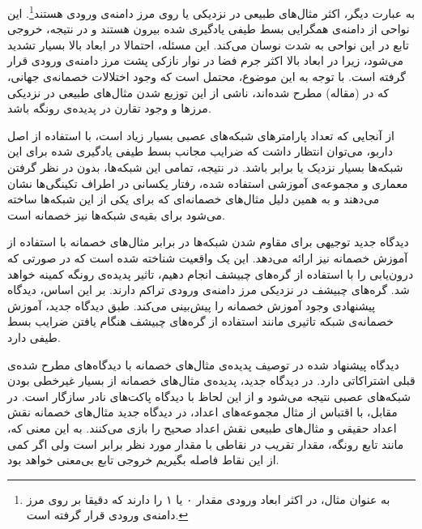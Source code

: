 \documentclass[12pt,onecolumn,a4paper]{article}
\begin{document}
به عبارت دیگر، اکثر مثال‌های طبیعی در نزدیکی یا روی مرز دامنه‌ی ورودی هستند\footnote{به عنوان مثال، در 
اکثر ابعاد ورودی مقدار ۰ یا ۱ را دارند که دقیقا بر روی مرز دامنه‌ی ورودی قرار گرفته است.}.
این نواحی از دامنه‌ی همگرایی بسط طیفی یادگیری شده بیرون هستند و در نتیجه، خروجی تابع در این نواحی به شدت نوسان می‌کند. این مسئله، احتمالا در ابعاد بالا بسیار تشدید می‌شود، زیرا در ابعاد بالا اکثر جرم فضا در نوار نازکی پشت مرز دامنه‌ی ورودی قرار گرفته است. با توجه به این موضوع، محتمل است که وجود اختلالات خصمانه‌ی جهانی، که در (مقاله) مطرح شده‌اند، ناشی از این توزیع شدن مثال‌های طبیعی در نزدیکی مرزها و وجود تقارن در پدیده‌ی رونگه باشد.

از آنجایی که تعداد پارامترهای شبکه‌های عصبی بسیار زیاد است، با استفاده از اصل داربو، می‌توان انتظار داشت که ضرایب مجانب بسط طیفی یادگیری شده برای این شبکه‌ها بسیار نزدیک یا برابر باشد. در نتیجه، تمامی این شبکه‌ها، بدون در نظر گرفتن معماری و مجموعه‌ی آموزشی استفاده شده، رفتار یکسانی در اطراف تکینگی‌ها نشان می‌دهند و به همین دلیل مثال‌های خصمانه‌ای که برای یکی از این شبکه‌ها ساخته می‌شود برای بقیه‌ی شبکه‌ها نیز خصمانه است.

دیدگاه جدید توجیهی برای مقاوم شدن شبکه‌ها در برابر مثال‌های خصمانه با استفاده از آموزش خصمانه نیز ارائه می‌دهد. این یک واقعیت شناخته شده است که در صورتی که درون‌یابی را با استفاده از گره‌های چبیشف انجام دهیم، تاثیر پدیده‌ی رونگه کمینه خواهد شد. گره‌های چبیشف در نزدیکی مرز دامنه‌ی ورودی تراکم دارند. بر این اساس، دیدگاه پیشنهادی وجود آموزش خصمانه را پیش‌بینی می‌کند. طبق دیدگاه جدید، آموزش خصمانه‌ی شبکه تاثیری مانند استفاده از گره‌های چبیشف هنگام یافتن ضرایب بسط طیفی دارد.

دیدگاه پیشنهاد شده در توصیف پدیده‌ی مثال‌های خصمانه با دیدگاه‌های مطرح شده‌ی قبلی اشتراکاتی دارد. در دیدگاه جدید، پدیده‌ی مثال‌های خصمانه از بسیار غیرخطی بودن شبکه‌های عصبی نتیجه می‌شود و از این لحاظ با دیدگاه پاکت‌های نادر سازگار است. در مقابل، با اقتباس از مثال مجموعه‌های اعداد، در دیدگاه جدید مثال‌های خصمانه نقش اعداد حقیقی و مثال‌های طبیعی نقش اعداد صحیح را بازی می‌کنند. به این معنی که، مانند تابع رونگه، مقدار تقریب در نقاطی با مقدار مورد نظر برابر است ولی اگر کمی از این نقاط فاصله بگیریم خروجی تابع بی‌معنی خواهد بود.
\end{document}
